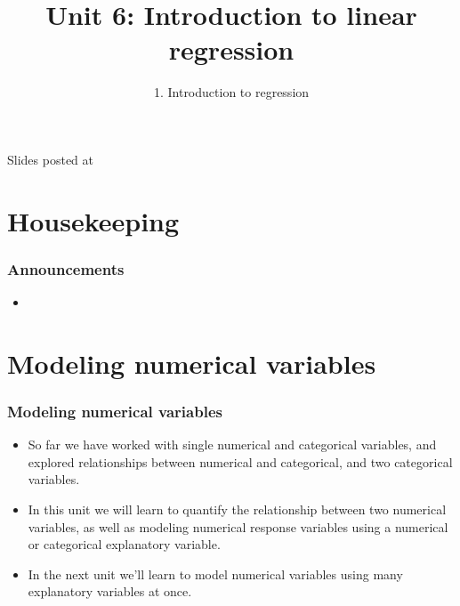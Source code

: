 \documentclass[11pt,containsverbatim,handout,xcolor=xelatex,dvipsnames,table]{beamer}
\title{Unit 6: Introduction to linear regression}
\subtitle{1. Introduction to regression}
\author{\CourseName}
\date{}
\institute{\InstituteName}
\begin{document}



\begin{frame}[plain]

\titlepage

\vfill

{\scriptsize {} \hfill Slides posted at  \webURL{\CourseSite}}

\addtocounter{framenumber}{-1} 

\end{frame}


\section{Housekeeping}


\begin{frame}
\frametitle{Announcements}

\begin{itemize}

\item 

\end{itemize}

\end{frame}


\section{Modeling numerical variables}


\begin{frame}
\frametitle{Modeling numerical variables}

\begin{itemize}

\item So far we have worked with single numerical and categorical variables, and explored relationships between numerical and categorical, and two categorical variables.

\item In this unit we will learn to quantify the relationship between two numerical variables, as well as modeling numerical response variables using a numerical or categorical explanatory variable.

\item In the next unit we'll learn to model numerical variables using many explanatory variables at once.

\end{itemize}

\end{frame}
\end{document}
